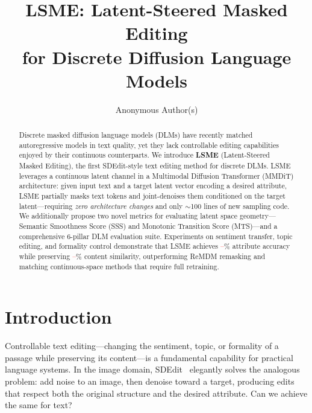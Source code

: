 \documentclass{article}
\title{LSME: Latent-Steered Masked Editing\\for Discrete Diffusion Language Models}
\author{
  Anonymous Author(s)
}
\newcommand{\tbd}[1]{\textcolor{red}{#1}}  %
\begin{document}
\maketitle

\begin{abstract}
Discrete masked diffusion language models (DLMs) have recently matched autoregressive models in text quality, yet they lack controllable editing capabilities enjoyed by their continuous counterparts.
We introduce \textbf{LSME} (Latent-Steered Masked Editing), the first SDEdit-style text editing method for discrete DLMs.
LSME leverages a continuous latent channel in a Multimodal Diffusion Transformer (MMDiT) architecture: given input text and a target latent vector encoding a desired attribute, LSME partially masks text tokens and joint-denoises them conditioned on the target latent---requiring \emph{zero architecture changes} and only $\sim$100 lines of new sampling code.
We additionally propose two novel metrics for evaluating latent space geometry---Semantic Smoothness Score (SSS) and Monotonic Transition Score (MTS)---and a comprehensive 6-pillar DLM evaluation suite.
Experiments on sentiment transfer, topic editing, and formality control demonstrate that LSME achieves \tbd{--}\% attribute accuracy while preserving \tbd{--}\% content similarity, outperforming ReMDM remasking and matching continuous-space methods that require full retraining.
\end{abstract}

\section{Introduction}
\label{sec:intro}

Controllable text editing---changing the sentiment, topic, or formality of a passage while preserving its content---is a fundamental capability for practical language systems.
In the image domain, SDEdit~\citep{meng2022} elegantly solves the analogous problem: add noise to an image, then denoise toward a target, producing edits that respect both the original structure and the desired attribute.
Can we achieve the same for text?
\end{document}
